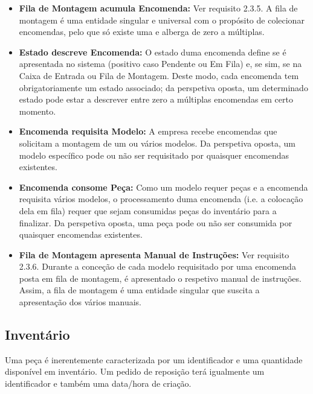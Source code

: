             \begin{itemize}
                \item \textbf{Fila de Montagem acumula Encomenda:} Ver requisito 2.3.5. A fila de montagem é uma entidade singular e universal com o propósito de colecionar encomendas, pelo que só existe uma e alberga de zero a múltiplas.
    
                \item \textbf{Estado descreve Encomenda:} O estado duma encomenda define se é apresentada no sistema (positivo caso Pendente ou Em Fila) e, se sim, se na Caixa de Entrada ou Fila de Montagem. Deste modo, cada encomenda tem obrigatoriamente um estado associado; da perspetiva oposta, um determinado estado pode estar a descrever entre zero a múltiplas encomendas em certo momento.
    
                \item \textbf{Encomenda requisita Modelo:} A empresa recebe encomendas que solicitam a montagem de um ou vários modelos. Da perspetiva oposta, um modelo específico pode ou não ser requisitado por quaisquer encomendas existentes. 
                
                \item \textbf{Encomenda consome Peça:} Como um modelo requer peças e a encomenda requisita vários modelos, o processamento duma encomenda (i.e. a colocação dela em fila) requer que sejam consumidas peças do inventário para a finalizar. Da perspetiva oposta, uma peça pode ou não ser consumida por quaisquer encomendas existentes. 
    
                \item \textbf{Fila de Montagem apresenta Manual de Instruções:} Ver requisito 2.3.6. Durante a conceção de cada modelo requisitado por uma encomenda posta em fila de montagem, é apresentado o respetivo manual de instruções. Assim, a fila de montagem é uma entidade singular que suscita a apresentação dos vários manuais.
        
            \end{itemize}

        \newpage
        \subsection{Inventário}

            Uma peça é inerentemente caracterizada por um identificador e uma quantidade disponível em inventário. Um pedido de reposição terá igualmente um identificador e também uma data/hora de criação.
        

